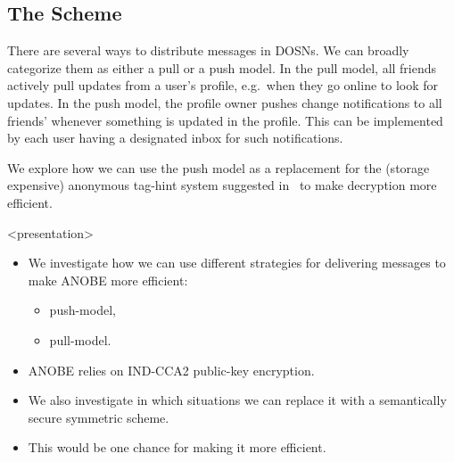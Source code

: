 \subsection{The Scheme}


There are several ways to distribute messages in \acp{DOSN}.
We can broadly categorize them as either a pull or a push model.
In the pull model, all friends actively pull updates from a user's profile, 
e.g.~when they go online to look for updates.
In the push model, the profile owner pushes change notifications to all 
friends' whenever something is updated in the profile.
This can be implemented by each user having a designated inbox for such 
notifications.

We explore how we can use the push model as a replacement for the (storage 
expensive) anonymous tag-hint system suggested in~\cite{anobe} to make 
decryption more efficient.

\begin{frame}<presentation>
  \begin{itemize}

    \item We investigate how we can use different strategies for delivering 
      messages to make \ac{ANOBE} more efficient:
      \begin{itemize}
        \item push-model,
        \item pull-model.
      \end{itemize}

    \item \ac{ANOBE} relies on IND-CCA2 public-key encryption.

    \item We also investigate in which situations we can replace it with 
      a semantically secure symmetric scheme.

    \item This would be one chance for making it more efficient.

  \end{itemize}
\end{frame}

